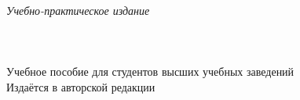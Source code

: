 \newpage
\thispagestyle{empty}
~\vfill
\begin{centering}
  \textit{Учебно-практическое издание}\\[18pt]
  \AuthorI\\[6pt]
  {\large\Title}\\[6pt]
  \PubType\\[18pt]
  Учебное пособие для студентов высших учебных заведений\\[18pt]
  Издаётся в авторской редакции\\
\end{centering}
\vspace{3cm}

